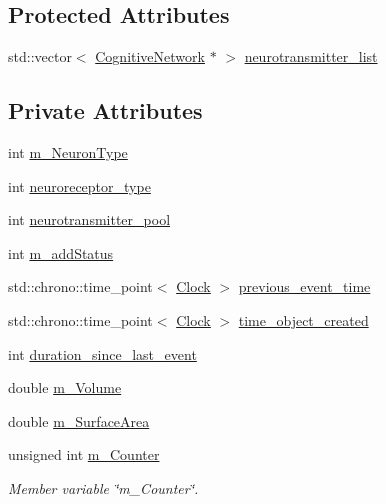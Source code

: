 \subsection*{Protected Attributes}
\begin{DoxyCompactItemize}
\item 
std\+::vector$<$ \mbox{\hyperlink{classCognitiveNetwork}{Cognitive\+Network}} $\ast$ $>$ \mbox{\hyperlink{classNeuroreceptor_aeb769732421531614a47bcab8ae21f8e}{neurotransmitter\+\_\+list}}
\end{DoxyCompactItemize}
\subsection*{Private Attributes}
\begin{DoxyCompactItemize}
\item 
int \mbox{\hyperlink{classNeuroreceptor_ab851e887c0570177192a0ff0c0e97e6b}{m\+\_\+\+Neuron\+Type}}
\item 
int \mbox{\hyperlink{classNeuroreceptor_a7fa3fda8a40bf5d42f687a6c8d0c90e8}{neuroreceptor\+\_\+type}}
\item 
int \mbox{\hyperlink{classNeuroreceptor_a12960bf3fcc399426d49a4c6b43b98e7}{neurotransmitter\+\_\+pool}}
\item 
int \mbox{\hyperlink{classNeuroreceptor_a72e33b87787c22588d891857ee3b3d89}{m\+\_\+add\+Status}}
\item 
std\+::chrono\+::time\+\_\+point$<$ \mbox{\hyperlink{universe_8h_a0ef8d951d1ca5ab3cfaf7ab4c7a6fd80}{Clock}} $>$ \mbox{\hyperlink{classNeuroreceptor_a135d843eb579212e0e5307b6062304d5}{previous\+\_\+event\+\_\+time}}
\item 
std\+::chrono\+::time\+\_\+point$<$ \mbox{\hyperlink{universe_8h_a0ef8d951d1ca5ab3cfaf7ab4c7a6fd80}{Clock}} $>$ \mbox{\hyperlink{classNeuroreceptor_a1ca4d66356d1e59850ea2d7591873ff5}{time\+\_\+object\+\_\+created}}
\item 
int \mbox{\hyperlink{classNeuroreceptor_af3b19cf8ef91627d66c718944ff3c67d}{duration\+\_\+since\+\_\+last\+\_\+event}}
\item 
double \mbox{\hyperlink{classNeuroreceptor_a38da9f3b9e759374eaa27039c5cd7eb1}{m\+\_\+\+Volume}}
\item 
double \mbox{\hyperlink{classNeuroreceptor_a635db1419140d67306d3164e7727087f}{m\+\_\+\+Surface\+Area}}
\item 
unsigned int \mbox{\hyperlink{classNeuroreceptor_a934ea2375feb82cc4b3ca94373542f57}{m\+\_\+\+Counter}}
\begin{DoxyCompactList}\small\item\em Member variable \char`\"{}m\+\_\+\+Counter\char`\"{}. \end{DoxyCompactList}\item 

\end{DoxyCompactItemize}
